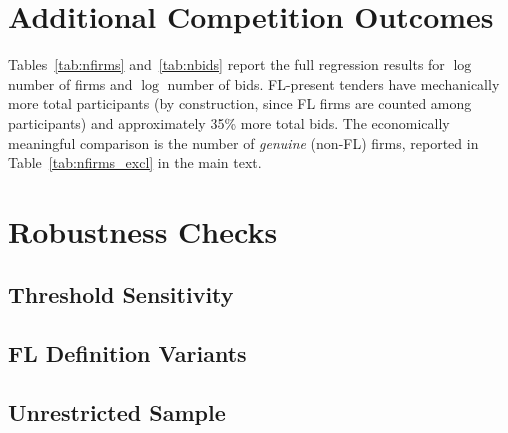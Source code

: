 
\section{Additional Competition Outcomes}
\label{app:competition}

Tables~\ref{tab:nfirms} and~\ref{tab:nbids} report the full regression
results for $\log$ number of firms and $\log$ number of bids. FL-present
tenders have mechanically more total participants (by construction,
since FL firms are counted among participants) and approximately 35\%
more total bids. The economically meaningful comparison is the number of
\emph{genuine} (non-FL) firms, reported in Table~\ref{tab:nfirms_excl}
in the main text.





\section{Robustness Checks}
\label{app:robustness}

\subsection{Threshold Sensitivity}

\begin{table}[htbp]
\centering
\caption{Price Coefficient Across IQR Multiplier Thresholds}
\label{tab:threshold}

\end{table}

\subsection{FL Definition Variants}







\subsection{Unrestricted Sample}


